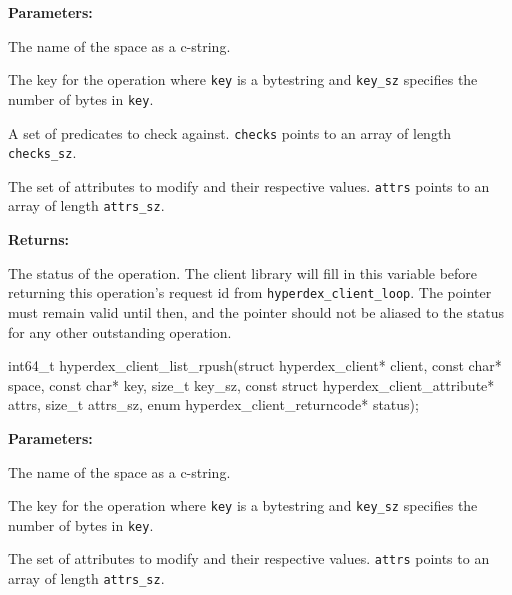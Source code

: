 \noindent\textbf{Parameters:}
\begin{description}[labelindent=\widthof{{\texttt{checks}, \texttt{checks\_sz}}},leftmargin=*,noitemsep,nolistsep,align=right]
\item[\texttt{space}] The name of the space as a c-string.
\item[\texttt{key}, \texttt{key\_sz}] The key for the operation where \texttt{key} is a bytestring and \texttt{key\_sz} specifies the number of bytes in \texttt{key}.
\item[\texttt{checks}, \texttt{checks\_sz}] A set of predicates to check against.  \texttt{checks} points to an array of length \texttt{checks\_sz}.
\item[\texttt{attrs}, \texttt{attrs\_sz}] The set of attributes to modify and their respective values.  \texttt{attrs} points to an array of length \texttt{attrs\_sz}.
\end{description}

\noindent\textbf{Returns:}
\begin{description}[labelindent=\widthof{{\texttt{status}}},leftmargin=*,noitemsep,nolistsep,align=right]
\item[\texttt{status}] The status of the operation.  The client library will fill in this variable before returning this operation's request id from \texttt{hyperdex\_client\_loop}.  The pointer must remain valid until then, and the pointer should not be aliased to the status for any other outstanding operation.
\end{description}

\funcsep
{}
\begin{ccode}
int64_t hyperdex_client_list_rpush(struct hyperdex_client* client,
                const char* space,
                const char* key, size_t key_sz,
                const struct hyperdex_client_attribute* attrs, size_t attrs_sz,
                enum hyperdex_client_returncode* status);
\end{ccode}
\funcdesc 

\noindent\textbf{Parameters:}
\begin{description}[labelindent=\widthof{{\texttt{attrs}, \texttt{attrs\_sz}}},leftmargin=*,noitemsep,nolistsep,align=right]
\item[\texttt{space}] The name of the space as a c-string.
\item[\texttt{key}, \texttt{key\_sz}] The key for the operation where \texttt{key} is a bytestring and \texttt{key\_sz} specifies the number of bytes in \texttt{key}.
\item[\texttt{attrs}, \texttt{attrs\_sz}] The set of attributes to modify and their respective values.  \texttt{attrs} points to an array of length \texttt{attrs\_sz}.
\end{description}

